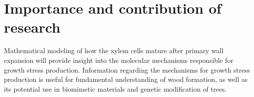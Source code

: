 \chapter{Importance and contribution of research}
Mathematical modeling of how the xylem cells mature after primary
wall expansion will provide insight into the molecular mechanisms
responsible for growth stress production. Information regarding the mechanisms
for growth stress production is useful for fundamental understanding of
wood formation, as well as its potential use in biomimetic materials and
genetic modification of trees.